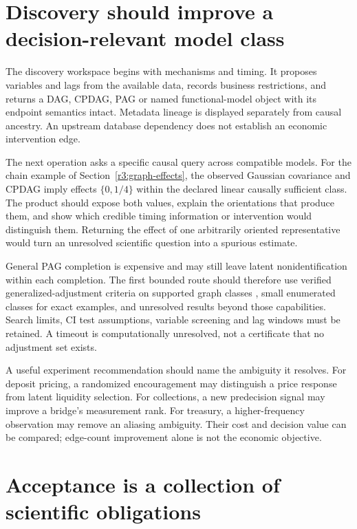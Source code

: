 \section{Discovery should improve a decision-relevant model class}
\label{r3:discovery-product}

The discovery workspace begins with mechanisms and timing. It proposes
variables and lags from the available data, records business restrictions,
and returns a DAG, CPDAG, PAG or named functional-model object with its
endpoint semantics intact. Metadata lineage is displayed separately
from causal ancestry. An upstream database dependency does not establish
an economic intervention edge.

The next operation asks a specific causal query across compatible models.
For the chain example of Section~\ref{r3:graph-effects}, the observed
Gaussian covariance and CPDAG imply effects $\{0,1/4\}$ within the
declared linear causally sufficient class. The product should expose
both values, explain the orientations that produce them, and show
which credible timing information or intervention would distinguish
them. Returning the effect of one arbitrarily oriented representative
would turn an unresolved scientific question into a spurious estimate.

General PAG completion is expensive and may still leave latent
nonidentification within each completion. The first bounded route
should therefore use verified generalized-adjustment criteria on
supported graph classes \citep{perkovic2018}, small enumerated classes
for exact examples, and unresolved results beyond those capabilities.
Search limits, CI test assumptions, variable screening and lag windows
must be retained. A timeout is computationally unresolved, not a
certificate that no adjustment set exists.

A useful experiment recommendation should name the ambiguity it resolves.
For deposit pricing, a randomized encouragement may distinguish a price
response from latent liquidity selection. For collections, a new
predecision signal may improve a bridge's measurement rank. For treasury,
a higher-frequency observation may remove an aliasing ambiguity. Their
cost and decision value can be compared; edge-count improvement alone
is not the economic objective.

\section{Acceptance is a collection of scientific obligations}
\label{r3:product-acceptance}

